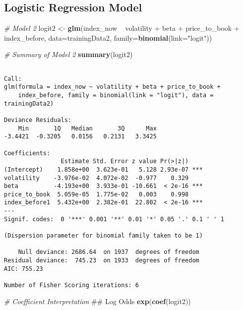 \documentclass[12pt,twoside]{reedthesis}
\newenvironment{Shaded}{\begin{snugshade}}{\end{snugshade}}
\newcommand{\KeywordTok}[1]{\textcolor[rgb]{0.13,0.29,0.53}{\textbf{{#1}}}}
\newcommand{\DataTypeTok}[1]{\textcolor[rgb]{0.13,0.29,0.53}{{#1}}}
\newcommand{\StringTok}[1]{\textcolor[rgb]{0.31,0.60,0.02}{{#1}}}
\newcommand{\CommentTok}[1]{\textcolor[rgb]{0.56,0.35,0.01}{\textit{{#1}}}}
\newcommand{\NormalTok}[1]{{#1}}
\theoremstyle{definition}
\theoremstyle{definition}
\theoremstyle{definition}
\theoremstyle{remark}
\begin{document}
\subsection{Logistic Regression
Model}\label{logistic-regression-model-2}
\begin{Shaded}
\begin{Highlighting}[]
\CommentTok{# Model 2}
\NormalTok{logit2 <-}\StringTok{ }\KeywordTok{glm}\NormalTok{(index_now ~}\StringTok{  }\NormalTok{volatility +}\StringTok{ }\NormalTok{beta +}\StringTok{ }\NormalTok{price_to_book }
\NormalTok{+}\StringTok{ }\NormalTok{index_before, }\DataTypeTok{data=}\NormalTok{trainingData2, }\DataTypeTok{family=}\KeywordTok{binomial}\NormalTok{(}\DataTypeTok{link=}\StringTok{"logit"}\NormalTok{))}

\CommentTok{# Summary of Model 2}
\KeywordTok{summary}\NormalTok{(logit2)}
\end{Highlighting}
\end{Shaded}
\begin{verbatim}

Call:
glm(formula = index_now ~ volatility + beta + price_to_book + 
    index_before, family = binomial(link = "logit"), data = trainingData2)

Deviance Residuals: 
    Min       1Q   Median       3Q      Max  
-3.4421  -0.3205   0.0156   0.2131   3.3425  

Coefficients:
                Estimate Std. Error z value Pr(>|z|)    
(Intercept)    1.858e+00  3.623e-01   5.128 2.93e-07 ***
volatility    -3.976e-02  4.072e-02  -0.977    0.329    
beta          -4.193e+00  3.933e-01 -10.661  < 2e-16 ***
price_to_book  5.059e-05  1.775e-02   0.003    0.998    
index_before1  5.432e+00  2.382e-01  22.802  < 2e-16 ***
---
Signif. codes:  0 '***' 0.001 '**' 0.01 '*' 0.05 '.' 0.1 ' ' 1

(Dispersion parameter for binomial family taken to be 1)

    Null deviance: 2686.64  on 1937  degrees of freedom
Residual deviance:  745.23  on 1933  degrees of freedom
AIC: 755.23

Number of Fisher Scoring iterations: 6
\end{verbatim}
\begin{Shaded}
\begin{Highlighting}[]
\CommentTok{# Coefficient Interpretation}
\NormalTok{## Log Odds}
\KeywordTok{exp}\NormalTok{(}\KeywordTok{coef}\NormalTok{(logit2))}
\end{Highlighting}
\end{Shaded}
\end{document}
